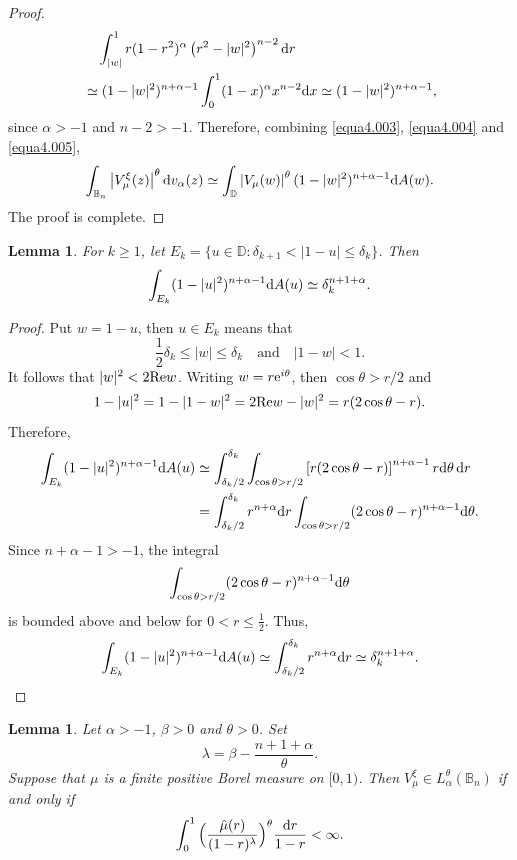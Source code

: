 \documentclass[preprint,12pt,times]{elsarticle}
\newtheorem{lemma}[theorem]{Lemma}
\theoremstyle{definition}
\theoremstyle{remark}
\numberwithin{equation}{section}
\begin{document}
\begin{proof}
\begin{equation}\label{equa4.005}
\begin{split}
&\quad\int_{|w|}^1 r(1-r^2)^{\alpha}\left(r^2-|w|^2\right)^{n-2}{\rm d}r\\
&\simeq (1-|w|^2)^{n+\alpha-1}\int_{0}^1 (1-x)^{\alpha}x^{n-2}{\rm d}x
\simeq (1-|w|^2)^{n+\alpha-1},
\end{split}
\end{equation}
since $\alpha>-1$ and $n-2>-1$. Therefore, combining \eqref{equa4.003}, \eqref{equa4.004} and \eqref{equa4.005},
\[
    \int_{\mathbb{B}_n}\left|V_{\mu}^{\xi}(z)\right|^{\theta}{\rm d}v_{\alpha}(z)\simeq \int_{\mathbb{D}}\left|V_{\mu}(w)\right|^{\theta}(1-|w|^2)^{n+\alpha-1}{\rm d}A(w).
\]
The proof is complete.
\end{proof}

\begin{lemma}\label{lemma4.2}
For $k\geq 1$, let $E_k=\{u\in\mathbb{D}: \delta_{k+1}<|1-u|\leq \delta_k\}$. Then 
\begin{equation*}
\int_{E_k}(1-|u|^2)^{n+\alpha-1}{\rm d}A(u)\simeq \delta_{k}^{n+1+\alpha}.
\end{equation*}
\end{lemma}

\begin{proof}
Put $w=1-u$, then $u\in E_k$ means that
\[
    \frac{1}{2}\delta_k\leq |w|\leq \delta_k \quad \text{and}\quad |1-w|<1.
\]
It follows that $|w|^2<2{\rm Re}w$. Writing $w=r{\rm e}^{i\theta}$, then $\cos\theta>r/2$ and
\[
    1-|u|^2=1-|1-w|^2=2{\rm Re}w-|w|^2=r(2\cos\theta-r).
\]
Therefore, 
\begin{align*}
\int_{E_k}(1-|u|^2)^{n+\alpha-1}{\rm d}A(u)&\simeq \int_{\delta_k/2}^{\delta_k}\int_{\cos\theta>r/2}\left[r(2\cos\theta-r)\right]^{n+\alpha-1}r{\rm d}\theta\,{\rm d}r\\
&=\int_{\delta_k/2}^{\delta_k}r^{n+\alpha}{\rm d}r\int_{\cos\theta>r/2}(2\cos\theta-r)^{n+\alpha-1}{\rm d}\theta.
\end{align*}
Since $n+\alpha-1>-1$, the integral
\[
    \int_{\cos\theta>r/2}(2\cos\theta-r)^{n+\alpha-1}{\rm d}\theta
\]
is bounded above and below for $0<r\leq \frac{1}{2}$. Thus,
\begin{equation*}
\int_{E_k}(1-|u|^2)^{n+\alpha-1}{\rm d}A(u)\simeq \int_{\delta_k/2}^{\delta_k}r^{n+\alpha}{\rm d}r\simeq \delta_k^{n+1+\alpha}.\qedhere
\end{equation*}
\end{proof}

\begin{lemma}\label{lemma4.3}
Let $\alpha>-1$, $\beta>0$ and   $\theta>0$. Set
\[
    \lambda=\beta-\frac{n+1+\alpha}{\theta}.
\]
Suppose that $\mu$ is a finite positive Borel measure on $[0,1)$. Then $V_{\mu}^{\xi}\in L_{\alpha}^{\theta}(\mathbb{B}_n)$ if and only if
\begin{equation}\label{equa4.3}
\int_{0}^1\Big(\frac{\hat{\mu}(r)}{(1-r)^{\lambda}}\Big)^{\theta}\frac{{\rm d}r}{1-r}<\infty.
\end{equation}
\end{lemma}
\end{document}
